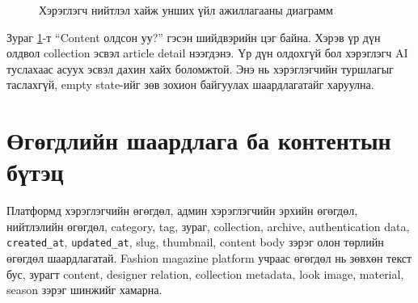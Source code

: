 \begin{figure}[htbp]
  \centering
  \resizebox{0.52\textwidth}{!}{}
  \caption[Хэрэглэгч нийтлэл хайж унших үйл ажиллагааны диаграмм]{Хэрэглэгч нийтлэл хайж унших үйл ажиллагааны диаграмм}
  \label{fig:ch2-activity-search-read}
\end{figure}

Зураг \ref{fig:ch2-activity-search-read}-т ``Content олдсон уу?'' гэсэн шийдвэрийн цэг байна. Хэрэв үр дүн олдвол collection эсвэл article detail нээгдэнэ. Үр дүн олдохгүй бол хэрэглэгч AI туслахаас асуух эсвэл дахин хайх боломжтой. Энэ нь хэрэглэгчийн туршлагыг таслахгүй, empty state-ийг зөв зохион байгуулах шаардлагатайг харуулна.

\section{Өгөгдлийн шаардлага ба контентын бүтэц}
Платформд хэрэглэгчийн өгөгдөл, админ хэрэглэгчийн эрхийн өгөгдөл, нийтлэлийн өгөгдөл, category, tag, зураг, collection, archive, authentication data, \texttt{created\_at}, \texttt{updated\_at}, slug, thumbnail, content body зэрэг олон төрлийн өгөгдөл шаардлагатай. Fashion magazine platform учраас өгөгдөл нь зөвхөн текст бус, зурагт content, designer relation, collection metadata, look image, material, season зэрэг шинжийг хамарна.

